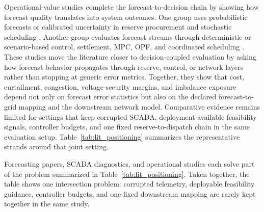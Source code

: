 \documentclass[review,1p,times]{elsarticle}
\begin{document}
Operational-value studies complete the forecast-to-decision chain by showing how forecast quality translates into system outcomes. One group uses probabilistic forecasts or calibrated uncertainty in reserve procurement and stochastic scheduling \citep{wang2011wind,quan2015computational,yan2025economicvalue}. Another group evaluates forecast streams through deterministic or scenario-based control, settlement, MPC, OPF, and coordinated scheduling \citep{davis2024impact,guo2023marketdesign,srinivasan2023flexibility,houben2023optimal,lechl2025flexcalc,terren2025extreme,huo2025pricesignal,li2024forecastmpc,guo2019windfarmmpc,khaloie2020coordinated,li2024opf_highren,liu2024vscopf,larrahondo2021acdcomp}. These studies move the literature closer to decision-coupled evaluation by asking how forecast behavior propagates through reserve, control, or network layers rather than stopping at generic error metrics. Together, they show that cost, curtailment, congestion, voltage-security margins, and imbalance exposure depend not only on forecast error statistics but also on the declared forecast-to-grid mapping and the downstream network model. Comparative evidence remains limited for settings that keep corrupted SCADA, deployment-available feasibility signals, controller budgets, and one fixed reserve-to-dispatch chain in the same evaluation setup. Table~\ref{tab:lit_positioning} summarizes the representative strands around that joint setting.

Forecasting papers, SCADA diagnostics, and operational studies each solve part of the problem summarized in Table~\ref{tab:lit_positioning}. Taken together, the table shows one intersection problem: corrupted telemetry, deployable feasibility guidance, controller budgets, and one fixed downstream mapping are rarely kept together in the same study.
\end{document}
